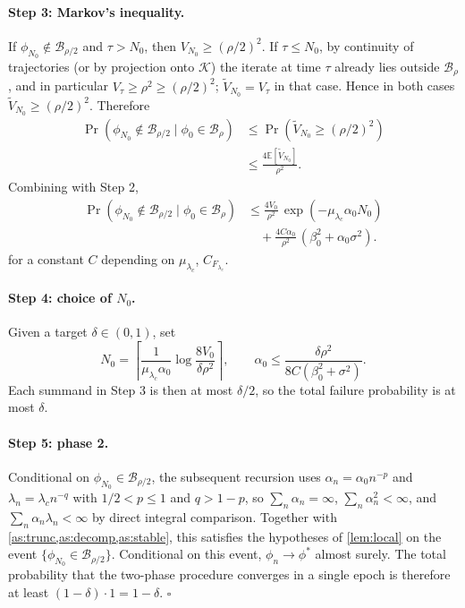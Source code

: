 \documentclass{article}
\theoremstyle{plain}
\theoremstyle{definition}
\theoremstyle{remark}
\newcommand{\E}{\mathbb{E}}
\newcommand{\K}{\mathcal{K}}
\newcommand{\B}{\mathcal{B}}
\begin{document}
\paragraph{Step 3: Markov's inequality.}
If $\phi_{N_0}\notin\B_{\rho/2}$ and $\tau>N_0$, then $V_{N_0}\ge (\rho/2)^2$. If $\tau\le N_0$, by continuity of trajectories (or by projection onto $\K$) the iterate at time $\tau$ already lies outside $\B_\rho$, and in particular $V_\tau\ge \rho^2\ge (\rho/2)^2$; $\tilde V_{N_0}=V_\tau$ in that case. Hence in both cases $\tilde V_{N_0}\ge (\rho/2)^2$. Therefore
\[
\begin{aligned}
\Pr(\phi_{N_0}\notin\B_{\rho/2}\mid \phi_0\in\B_\rho)
&\le \Pr(\tilde V_{N_0}\ge (\rho/2)^2) \\
&\le \frac{4\E[\tilde V_{N_0}]}{\rho^2}.
\end{aligned}
\]
Combining with Step 2,
\[
\begin{aligned}
\Pr(\phi_{N_0}\notin\B_{\rho/2}\mid\phi_0\in\B_\rho)
&\le \frac{4V_0}{\rho^2}\,
\exp\!\left(-\mu_{\lambda_c}\alpha_0 N_0\right) \\
&\quad + \frac{4C\alpha_0}{\rho^2}\,
\left(\beta_0^2+\alpha_0\sigma^2\right).
\end{aligned}
\]
for a constant $C$ depending on $\mu_{\lambda_c}$, $C_{F_{\lambda_c}}$.

\paragraph{Step 4: choice of $N_0$.}
Given a target $\delta\in(0,1)$, set
\[
N_0=\left\lceil\frac{1}{\mu_{\lambda_c}\alpha_0}\log\!\frac{8V_0}{\delta\rho^2}\right\rceil,
\qquad \alpha_0\le \frac{\delta\rho^2}{8C(\beta_0^2+\sigma^2)}.
\]
Each summand in Step 3 is then at most $\delta/2$, so the total failure probability is at most $\delta$.

\paragraph{Step 5: phase 2.}
Conditional on $\phi_{N_0}\in\B_{\rho/2}$, the subsequent recursion uses $\alpha_n=\alpha_0 n^{-p}$ and $\lambda_n=\lambda_c n^{-q}$ with $1/2<p\le 1$ and $q>1-p$, so $\sum_n\alpha_n=\infty$, $\sum_n\alpha_n^2<\infty$, and $\sum_n\alpha_n\lambda_n<\infty$ by direct integral comparison. Together with \cref{as:trunc,as:decomp,as:stable}, this satisfies the hypotheses of \cref{lem:local} on the event $\{\phi_{N_0}\in\B_{\rho/2}\}$. Conditional on this event, $\phi_n\to\phi^\ast$ almost surely. The total probability that the two-phase procedure converges in a single epoch is therefore at least $(1-\delta)\cdot 1=1-\delta$. $\square$
\end{document}
